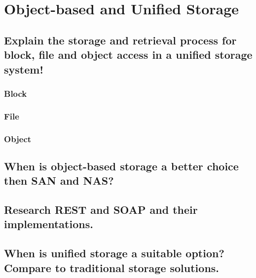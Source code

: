 \section{Object-based and Unified Storage} %
\label{sec:object_based_and_unified_storage}

\subsection{Explain the storage and retrieval process for block, file and object access in a unified storage system!} %
\label{sub:explain_the_storage_and_retrieval_process_for_block_file_and_object_access_in_a_unified_storage_system!}
	\subsubsection{Block} %
	\label{ssub:block}
	
	\subsubsection{File} %
	\label{ssub:file}
	
	\subsubsection{Object} %
	\label{ssub:object}
	

\subsection{When is object-based storage a better choice then SAN and NAS?} %
\label{sub:when_is_object_based_storage_a_better_choice_then_san_and_nas}


\subsection{Research REST and SOAP and their implementations.} %
\label{sub:research_rest_and_soap_and_their_implementations}


\subsection{When is unified storage a suitable option? Compare to traditional storage solutions.} %
\label{sub:when_is_unified_storage_a_suitable_option_compare_to_traditional_storage_solutions}


